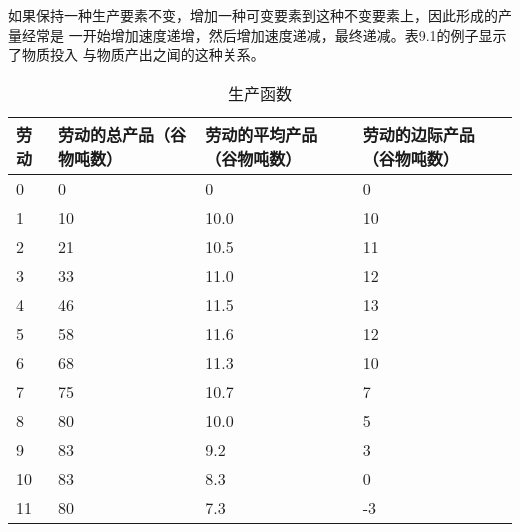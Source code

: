 如果保持一种生产要素不变，增加一种可变要素到这种不变要素上，因此形成的产量经常是
一开始增加速度递增，然后增加速度递减，最终递减。表9.1的例子显示了物质投入
与物质产出之闻的这种关系。

\begin{table}[htbp]
  \centering
  \caption{生产函数}
  \label{tab:productfunc}
  \footnotesize
  \begin{tabularx}{\linewidth}{@{}XXXX@{}}
    \toprule
    劳动 & 劳动的总产品\newline（谷物吨数） & 劳动的平均产品\newline（谷物吨数） & 劳动的边际产品\newline（谷物吨数） \\ \midrule
    0 & 0 & 0 & 0 \\
    1 & 10 & 10.0 & 10 \\
    2 & 21 & 10.5 & 11 \\
    3 & 33 & 11.0 & 12 \\
    4 & 46 & 11.5 & 13 \\
    5 & 58 & 11.6 & 12 \\
    6 & 68 & 11.3 & 10 \\
    7 & 75 & 10.7 &  7\\
    8 & 80 & 10.0 &  5\\
    9 & 83 &  9.2 &  3\\
    10 & 83 &  8.3 &  0\\
    11 & 80 &  7.3 &  -3\\ \bottomrule
  \end{tabularx}%
\end{table}

